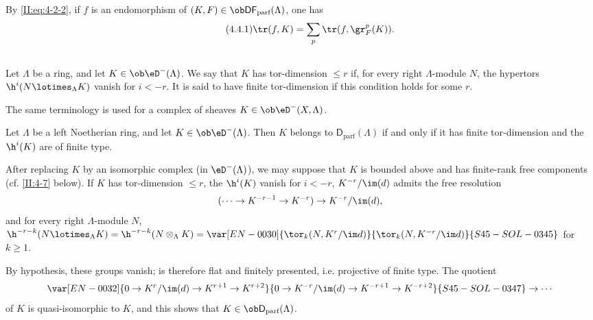By \eqref{II:eq:4-2-2}, if $f$ is an endomorphism of
$(K,F)\in\ob\mathsf{DF}_\text{parf}(\Lambda)$, one has
\begin{equation*}\tag{4.4.1}\label{II:eq:4-4-1}
 \tr(f,K) = \sum_p \tr(f,\gr_F^p(K)) \text{.}
\end{equation*}






\subsection{}\label{II:4-5}

Let $\Lambda$ be a ring, and let $K\in\ob\eD^-(\Lambda)$. We say that $K$
has tor-dimension $\leqslant r$ if, for every right $\Lambda$-module $N$, the
hypertors $\h^i(N\lotimes_\Lambda K)$ vanish for $i<-r$. It is said to have
finite tor-dimension if this condition holds for some $r$.

The same terminology is used for a complex of sheaves
$K\in\ob\eD^-(X,\Lambda)$.






\begin{lemma}\label{II:4-5-1}
Let $\Lambda$ be a left Noetherian ring, and let
$K\in\ob\eD^-(\Lambda)$. Then $K$ belongs to
$\mathsf{D}_\text{parf}(\Lambda)$ if and only if it has finite tor-dimension
and the $\h^i(K)$ are of finite type.
\end{lemma}

After replacing $K$ by an isomorphic complex (in $\eD^-(\Lambda)$), we may
suppose that $K$ is bounded above and has finite-rank free components (cf.
\ref{II:4-7} below). If $K$ has tor-dimension $\leqslant r$, the
$\h^i(K)$ vanish for $i<-r$, $K^{-r}/\im(d)$ admits the free resolution
\[
  (\cdots \to K^{-r-1} \to K^{-r}) \to K^{-r}/\im(d) \text{,}
\]
and for every right $\Lambda$-module $N$,
$\h^{-r-k}(N\lotimes_\Lambda K) = \h^{-r-k}(N\otimes_\Lambda K)
= \var[EN-0030]{\tor_k(N,K^r/\im d)}{\tor_k(N,K^{-r}/\im d)}{S45-SOL-0345}$ for $k\geqslant 1$.

By hypothesis, these groups vanish;  is therefore
flat and finitely presented, i.e. projective of finite type. The quotient
\[
  \var[EN-0032]{0 \to K^r/\im(d) \to K^{r+1} \to K^{r+2}}{0 \to K^{-r}/\im(d) \to K^{-r+1} \to K^{-r+2}}{S45-SOL-0347}\to \cdots
\]
of $K$ is quasi-isomorphic to $K$, and this shows that
$K\in\ob\mathsf{D}_\text{parf}(\Lambda)$.






